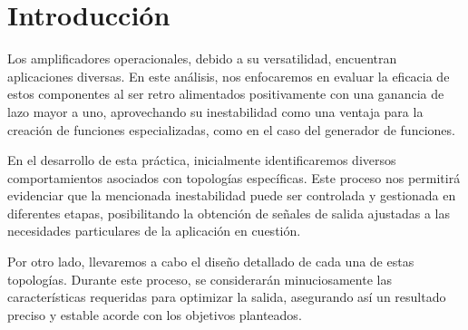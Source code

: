 
\section{Introducción}
    
Los amplificadores operacionales, debido a su versatilidad, encuentran aplicaciones diversas. En este análisis, nos enfocaremos en evaluar la eficacia de estos componentes al ser retro alimentados positivamente con una ganancia de lazo mayor a uno, aprovechando su inestabilidad como una ventaja para la creación de funciones especializadas, como en el caso del generador de funciones.

En el desarrollo de esta práctica, inicialmente identificaremos diversos comportamientos asociados con topologías específicas. Este proceso nos permitirá evidenciar que la mencionada inestabilidad puede ser controlada y gestionada en diferentes etapas, posibilitando la obtención de señales de salida ajustadas a las necesidades particulares de la aplicación en cuestión.

Por otro lado, llevaremos a cabo el diseño detallado de cada una de estas topologías. Durante este proceso, se considerarán minuciosamente las características requeridas para optimizar la salida, asegurando así un resultado preciso y estable acorde con los objetivos planteados.

\newpage